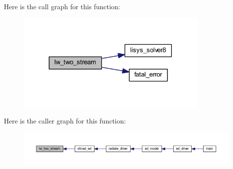 Here is the call graph for this function\+:\nopagebreak
\begin{figure}[H]
\begin{center}
\leavevmode
\includegraphics[width=269pt]{twostream__rad_8f90_a6581b5d4ea4bd5a6c7a8e742257dd0d1_cgraph}
\end{center}
\end{figure}




Here is the caller graph for this function\+:\nopagebreak
\begin{figure}[H]
\begin{center}
\leavevmode
\includegraphics[width=350pt]{twostream__rad_8f90_a6581b5d4ea4bd5a6c7a8e742257dd0d1_icgraph}
\end{center}
\end{figure}


